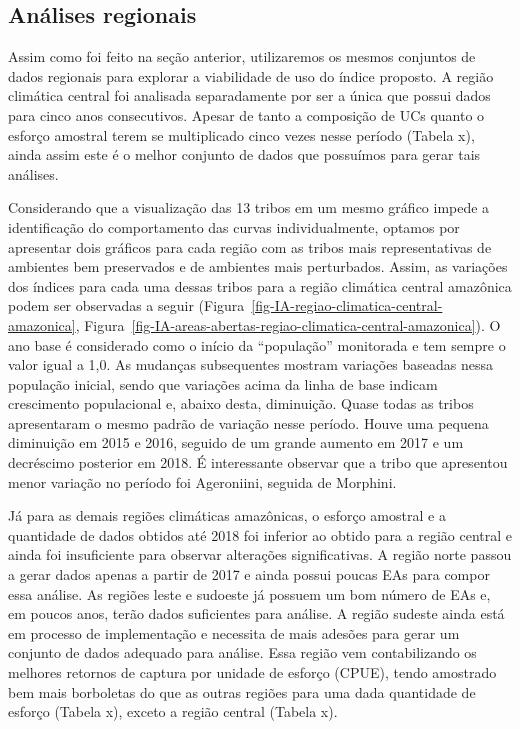 \documentclass[
  letterpaper,
]{scrbook}
\begin{document}
\subsection{Análises regionais}\label{anuxe1lises-regionais}

Assim como foi feito na seção anterior, utilizaremos os mesmos conjuntos
de dados regionais para explorar a viabilidade de uso do índice
proposto. A região climática central foi analisada separadamente por ser
a única que possui dados para cinco anos consecutivos. Apesar de tanto a
composição de UCs quanto o esforço amostral terem se multiplicado cinco
vezes nesse período (Tabela x), ainda assim este é o melhor conjunto de
dados que possuímos para gerar tais análises.

Considerando que a visualização das 13 tribos em um mesmo gráfico impede
a identificação do comportamento das curvas individualmente, optamos por
apresentar dois gráficos para cada região com as tribos mais
representativas de ambientes bem preservados e de ambientes mais
perturbados. Assim, as variações dos índices para cada uma dessas tribos
para a região climática central amazônica podem ser observadas a seguir
(Figura~\ref{fig-IA-regiao-climatica-central-amazonica},
Figura~\ref{fig-IA-areas-abertas-regiao-climatica-central-amazonica}). O
ano base é considerado como o início da ``população'' monitorada e tem
sempre o valor igual a 1,0. As mudanças subsequentes mostram variações
baseadas nessa população inicial, sendo que variações acima da linha de
base indicam crescimento populacional e, abaixo desta, diminuição. Quase
todas as tribos apresentaram o mesmo padrão de variação nesse período.
Houve uma pequena diminuição em 2015 e 2016, seguido de um grande
aumento em 2017 e um decréscimo posterior em 2018. É interessante
observar que a tribo que apresentou menor variação no período foi
Ageroniini, seguida de Morphini.

Já para as demais regiões climáticas amazônicas, o esforço amostral e a
quantidade de dados obtidos até 2018 foi inferior ao obtido para a
região central e ainda foi insuficiente para observar alterações
significativas. A região norte passou a gerar dados apenas a partir de
2017 e ainda possui poucas EAs para compor essa análise. As regiões
leste e sudoeste já possuem um bom número de EAs e, em poucos anos,
terão dados suficientes para análise. A região sudeste ainda está em
processo de implementação e necessita de mais adesões para gerar um
conjunto de dados adequado para análise. Essa região vem contabilizando
os melhores retornos de captura por unidade de esforço (CPUE), tendo
amostrado bem mais borboletas do que as outras regiões para uma dada
quantidade de esforço (Tabela x), exceto a região central (Tabela x).
\end{document}
